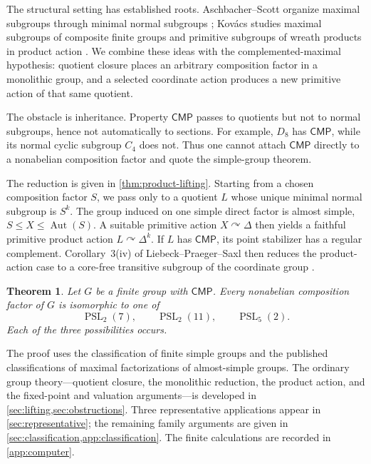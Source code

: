 \documentclass[11pt]{amsart}
\newcommand{\CMP}{\mathsf{CMP}}
\newcommand{\Aut}{\operatorname{Aut}}
\newcommand{\PSL}{\operatorname{PSL}}
\newtheorem{theorem}{Theorem}[section]
\theoremstyle{definition}
\begin{document}
The structural setting has established roots.  Aschbacher--Scott organize
maximal subgroups through minimal normal subgroups
\cite{aschbacher-scott}; Kov\'acs studies maximal subgroups of composite
finite groups \cite{kovacs-composite} and primitive subgroups of wreath
products in product action \cite{kovacs-product}.  We combine these ideas
with the complemented-maximal hypothesis: quotient closure places an
arbitrary composition factor in a monolithic group, and a selected coordinate
action produces a new primitive action of that same quotient.

The obstacle is inheritance.  Property \(\CMP\) passes to quotients but not
to normal subgroups, hence not automatically to sections.  For example,
\(D_8\) has \(\CMP\), while its normal cyclic subgroup \(C_4\) does not.
Thus one cannot attach \(\CMP\) directly to a nonabelian composition factor
and quote the simple-group theorem.

The reduction is given in \cref{thm:product-lifting}.  Starting from a chosen
composition factor \(S\), we pass only to a quotient \(L\) whose unique
minimal normal subgroup is \(S^k\).  The group induced on one simple direct
factor is almost simple, \(S\leq X\leq\Aut(S)\).  A suitable primitive action
\(X\curvearrowright\Delta\) then yields a faithful primitive product action
\(L\curvearrowright\Delta^k\).  If \(L\) has \(\CMP\), its point stabilizer
has a regular complement.  Corollary~3(iv) of Liebeck--Praeger--Saxl then
reduces the product-action case to a core-free transitive subgroup of the
coordinate group \cite{lps-transitive}.

\begin{theorem}\label{thm:main}
Let \(G\) be a finite group with \(\CMP\).  Every nonabelian composition
factor of \(G\) is isomorphic to one of
\[
\PSL_2(7),\qquad \PSL_2(11),\qquad \PSL_5(2).
\]
Each of the three possibilities occurs.
\end{theorem}

The proof uses the classification of finite simple groups and the published
classifications of maximal factorizations of almost-simple groups.  The
ordinary group theory---quotient closure, the monolithic reduction, the
product action, and the fixed-point and valuation arguments---is developed in
\cref{sec:lifting,sec:obstructions}.  Three representative applications
appear in \cref{sec:representative}; the remaining family arguments are given
in \cref{sec:classification,app:classification}.  The finite calculations are
recorded in \cref{app:computer}.
\end{document}
